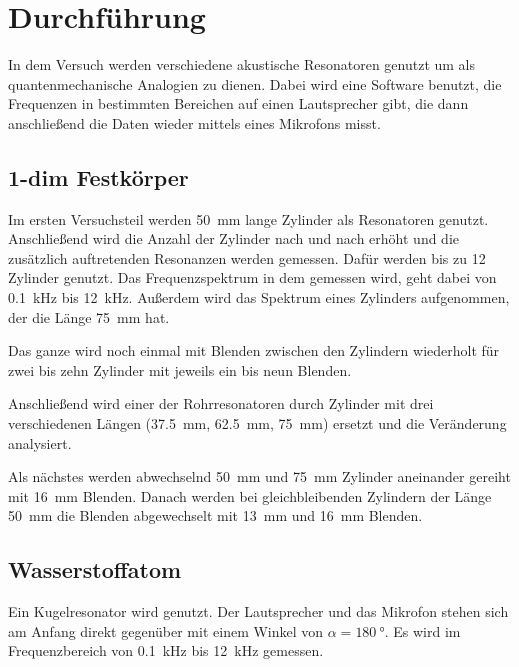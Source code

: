 \section{Durchführung}
\label{sec:Durchführung}

In dem Versuch werden verschiedene akustische Resonatoren genutzt um als quantenmechanische Analogien zu dienen.
Dabei wird eine Software benutzt, die Frequenzen in bestimmten Bereichen auf einen Lautsprecher gibt, die dann anschließend die Daten wieder mittels eines Mikrofons misst. 

\subsection{1-dim Festkörper}

Im ersten Versuchsteil werden \SI{50}{\milli\meter} lange Zylinder als Resonatoren genutzt. Anschließend wird die Anzahl der Zylinder nach und nach erhöht und die zusätzlich auftretenden Resonanzen werden gemessen. 
Dafür werden bis zu \num{12} Zylinder genutzt.
Das Frequenzspektrum in dem gemessen wird, geht dabei von \SI{0.1}{\kilo\hertz} bis \SI{12}{\kilo\hertz}. 
Außerdem wird das Spektrum eines Zylinders aufgenommen, der die Länge \SI{75}{\milli\metre} hat.

Das ganze wird noch einmal mit Blenden zwischen den Zylindern wiederholt für zwei bis zehn Zylinder mit jeweils ein bis neun Blenden. 

Anschließend wird einer der Rohrresonatoren durch Zylinder mit drei verschiedenen Längen (\SI{37.5}{\milli\meter}, \SI{62.5}{\milli\metre}, \SI{75}{\milli\metre}) ersetzt und die Veränderung analysiert. 

Als nächstes werden abwechselnd \SI{50}{\milli\metre} und \SI{75}{\milli\metre} Zylinder aneinander gereiht mit \SI{16}{\milli\meter} Blenden. 
Danach werden bei gleichbleibenden Zylindern der Länge \SI{50}{\milli\metre} die Blenden abgewechselt mit \SI{13}{\milli\metre} und \SI{16}{\milli\meter} Blenden. 

\subsection{Wasserstoffatom}

Ein Kugelresonator wird genutzt. Der Lautsprecher und das Mikrofon stehen sich am Anfang direkt gegenüber mit einem Winkel von $\alpha = \SI{180}{\degree}$. 
Es wird im Frequenzbereich von \SI{0.1}{\kilo\hertz} bis \SI{12}{\kilo\hertz} gemessen. 

